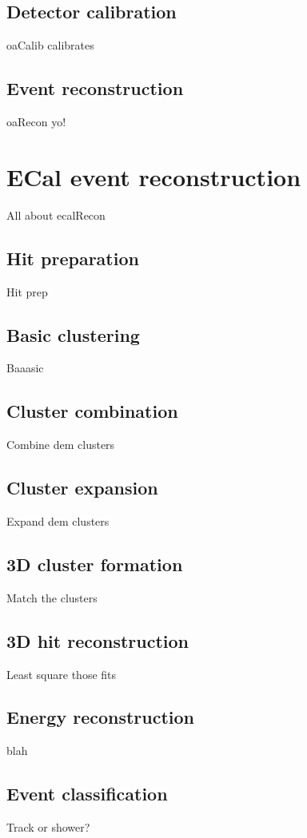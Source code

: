 \subsection{Detector calibration}
\label{subsec:DetectorCalibration}
oaCalib calibrates

\subsection{Event reconstruction}
\label{subsec:EventReconstruction}
oaRecon yo!

\section{ECal event reconstruction}
\label{sec:ECalEventReconstruction}
All about ecalRecon

\subsection{Hit preparation}
\label{subsec:ECalHitPerparation}
Hit prep

\subsection{Basic clustering}
\label{subsec:ECalBasicClustering}
Baaasic

\subsection{Cluster combination}
\label{subsec:ECalCombineClusters}
Combine dem clusters

\subsection{Cluster expansion}
\label{subsec:ECalExpandClusters}
Expand dem clusters

\subsection{3D cluster formation}
\label{subsec:ECal3DMatching}
Match the clusters

\subsection{3D hit reconstruction}
\label{subsec:ECal3DHitReconstruction}
Least square those fits

\subsection{Energy reconstruction}
\label{subsec:ECalEnergyReconstruction}
blah

\subsection{Event classification}
\label{subsec:ECalParticleIdentification}
Track or shower?
